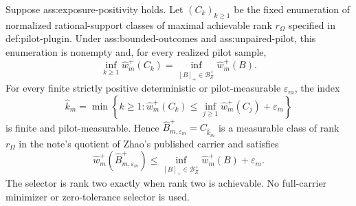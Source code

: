 Suppose ass:exposure-positivity holds.  Let \((C_k)_{k\ge1}\) be the fixed enumeration of normalized rational-support classes of maximal achievable rank \(r_\Omega\) specified in def:pilot-plugin.  Under ass:bounded-outcomes and ass:unpaired-pilot, this enumeration is nonempty and, for every realized pilot sample,
\[
 \inf_{k\ge1}\widehat w_m^+(C_k)
 =\inf_{[B]_+\in\mathcal B_Z^+}\widehat w_m^+(B).
\]
For every finite strictly positive deterministic or pilot-measurable \(\varepsilon_m\), the index
\[
 \widehat k_m=
 \min\left\{k\ge1:
 \widehat w_m^+(C_k)
 \le \inf_{j\ge1}\widehat w_m^+(C_j)+\varepsilon_m
 \right\}
\]
is finite and pilot-measurable.  Hence \(\widehat B_{m,\varepsilon_m}^+=C_{\widehat k_m}\) is a measurable class of rank \(r_\Omega\) in the note's quotient of Zhao's published carrier and satisfies
\[
 \widehat w_m^+(\widehat B_{m,\varepsilon_m}^+)
 \le
 \inf_{[B]_+\in\mathcal B_Z^+}\widehat w_m^+(B)+\varepsilon_m.
\]
The selector is rank two exactly when rank two is achievable.  No full-carrier minimizer or zero-tolerance selector is used.